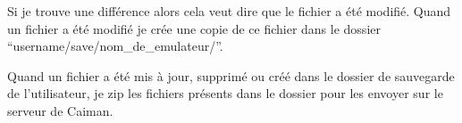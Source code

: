 \documentclass[a4paper,12pt,french]{sphinxmanual}
\begin{document}
\begin{sphinxVerbatim}[commandchars=\\\{\}]
                      



          
                
            \PYG{p}{[}\PYG{p}{]}    
                

                       
                 
\end{sphinxVerbatim}

\sphinxAtStartPar
Si je trouve une différence alors cela veut dire que le fichier a été modifié. Quand un fichier a été modifié je crée une copie de ce fichier dans le dossier “username/save/nom\_de\_emulateur/”.

\sphinxAtStartPar
Quand un fichier a été mis à jour, supprimé ou créé dans le dossier de sauvegarde de l’utilisateur, je zip les fichiers présents dans le dossier pour les envoyer sur le serveur de Caiman.
\end{document}
